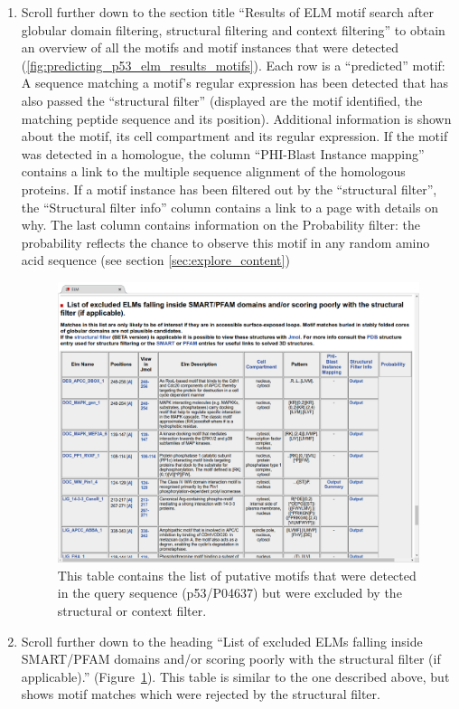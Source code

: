 \documentclass[12pt]{article}
\begin{document}
\begin{enumerate}
\item Scroll further down to the section title ``Results of ELM motif search
	after globular domain filtering, structural filtering and context
	filtering'' to obtain an overview of all the motifs and motif
	instances that were detected
	(\ref{fig:predicting_p53_elm_results_motifs}).
	Each row is a ``predicted'' motif: A sequence matching a
	motif's regular expression has been detected that has also passed the
	``structural filter'' (displayed are the motif identified, the matching peptide
	sequence and its position). Additional information is shown about the
	motif, its cell compartment and its regular expression. If the motif
	was detected in a homologue, the column ``PHI-Blast Instance
	mapping'' contains a link to the multiple sequence alignment of the
	homologous proteins. If a motif instance has been filtered out
	by the ``structural filter'', the ``Structural filter info'' column
	contains a link to a page with details on why.
	The last column contains information on the Probability filter: the
	probability reflects the chance to observe this motif in any random
	amino acid sequence (see section \ref{sec:explore_content})

\begin{figure}[h!]
\centering
	\includegraphics[width=\textwidth]{Figures/predicting_p53/elm_results_motifs_filtered.png}
	\caption{
	This table contains the list of putative motifs that were detected in
	the query sequence (p53/P04637) but were excluded by the
	structural or context filter.
	}
	\label{fig:predicting_p53_elm_results_motifs_filtered}
\end{figure}

\item Scroll further down to the heading ``List of excluded ELMs falling inside
	SMART/PFAM domains and/or scoring poorly with the structural filter (if
	applicable).''
	(Figure~\ref{fig:predicting_p53_elm_results_motifs_filtered}).
	This table is similar to the one described above, but shows motif
	matches which were rejected by the structural filter.
\end{enumerate}
\end{document}
